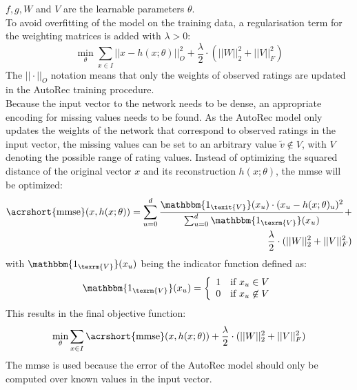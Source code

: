 $f, g, W$ and $V$ are the learnable parameters $\theta$.\\
To avoid overfitting of the model on the training data, a regularisation term for the weighting matrices is added with $\lambda > 0$:\\
\begin{equation}
   \min_{\theta}\sum_{x \in I} ||x - h(x; \theta)||^{2}_{O} + \frac{\lambda}{2} \cdot (||W||^{2}_{2} + ||V||^{2}_{F})
\end{equation}
The $||\cdot||_{O}$ notation means that only the weights of observed ratings are updated in the AutoRec training procedure.\\
Because the input vector to the network needs to be dense, an appropriate encoding for missing values needs to be found. As the AutoRec model only updates the weights of the network that correspond to observed ratings in the input vector, the missing values can be set to an arbitrary value $\tilde{v} \not\in V$, with $V$ denoting the possible range of rating values. Instead of optimizing the squared distance of the original vector $x$ and its reconstruction $h(x; \theta)$, the \acrfull{mmse} will be optimized:\\
\begin{equation}
\begin{align*}
    \text{\acrshort{mmse}}(x, h(x;\theta)) = \sum_{u=0}^{d}\frac{\mathbbm{1_{\texit{V}}}(x_u) \cdot (x_u - h(x;\theta)_u)^{2}}
    {\sum_{u=0}^{d} \mathbbm{1_{\texrm{V}}}(x_u)} + \\ \frac{\lambda}{2} \cdot (||W||^{2}_{2} + ||V||^{2}_{F}) 
\end{align*}
\end{equation}
with $\mathbbm{1_{\texrm{V}}}(x_u)$ being the indicator function defined as:\\
\begin{equation}
    \mathbbm{1_{\texrm{V}}}(x_u) = \left\{
	\begin{array}{ll}
		1  & \mbox{if } x_u \in V\\
		0 & \mbox{if } x_u \not\in V \\
	\end{array}
\right.
\end{equation}
This results in the final objective function:\\
\begin{equation}
    \min_{\theta}\sum_{x \in I} \text{\acrshort{mmse}}(x, h(x;\theta)) + \frac{\lambda}{2} \cdot (||W||^{2}_{2} + ||V||^{2}_{F})
\end{equation}
The \acrshort{mmse} is used because the error of the AutoRec model should only be computed over known values in the input vector.\\

